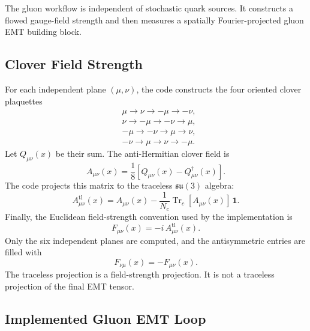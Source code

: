 \documentclass[11pt,a4paper]{article}
\newcommand{\Trc}{\operatorname{Tr}_{c}}
\begin{document}
The gluon workflow is independent of stochastic quark sources.  It constructs a
flowed gauge-field strength and then measures a spatially Fourier-projected
gluon EMT building block.

\subsection{Clover Field Strength}

For each independent plane \((\mu,\nu)\), the code constructs the four oriented
clover plaquettes
\begin{align}
  &\mu \to \nu \to -\mu \to -\nu, \\
  &\nu \to -\mu \to -\nu \to \mu, \\
  &-\mu \to -\nu \to \mu \to \nu, \\
  &-\nu \to \mu \to \nu \to -\mu.
\end{align}
Let \(Q_{\mu\nu}(x)\) be their sum.  The anti-Hermitian clover field is
\begin{equation}
  A_{\mu\nu}(x)
  =
  \frac{1}{8}
  \left[
    Q_{\mu\nu}(x)-Q_{\mu\nu}^\dagger(x)
  \right].
  \label{eq:clover_A}
\end{equation}
The code projects this matrix to the traceless \(\mathfrak{su}(3)\) algebra:
\begin{equation}
  A^{\mathrm{tl}}_{\mu\nu}(x)
  =
  A_{\mu\nu}(x)
  -
  \frac{1}{N_c}
  \Trc[A_{\mu\nu}(x)]\,\mathbf{1}.
  \label{eq:clover_traceless}
\end{equation}
Finally, the Euclidean field-strength convention used by the implementation is
\begin{equation}
  F_{\mu\nu}(x) = -i\,A^{\mathrm{tl}}_{\mu\nu}(x).
  \label{eq:F_euclidean}
\end{equation}
Only the six independent planes are computed, and the antisymmetric entries are
filled with
\begin{equation}
  F_{\nu\mu}(x) = -F_{\mu\nu}(x).
\end{equation}
The traceless projection is a field-strength projection.  It is not a
traceless projection of the final EMT tensor.

\subsection{Implemented Gluon EMT Loop}
\end{document}
